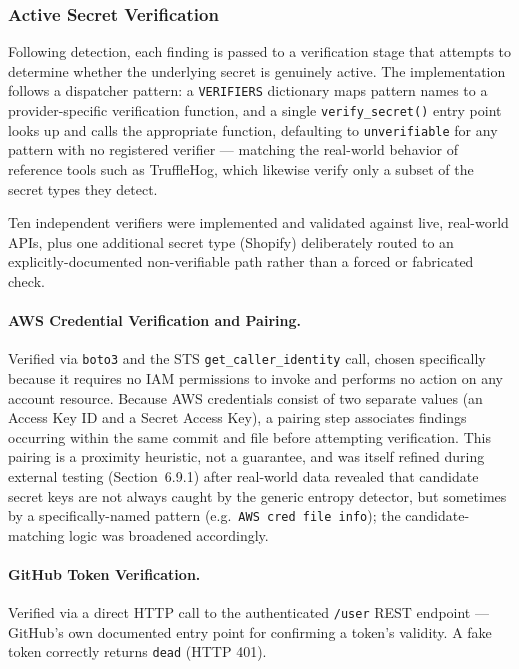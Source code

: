 \documentclass[12pt]{article}
\begin{document}
\subsubsection{Active Secret Verification}

Following detection, each finding is passed to a verification stage that attempts to determine whether the underlying secret is genuinely active. The implementation follows a dispatcher pattern: a \texttt{VERIFIERS} dictionary maps pattern names to a provider-specific verification function, and a single \texttt{verify\_secret()} entry point looks up and calls the appropriate function, defaulting to \texttt{unverifiable} for any pattern with no registered verifier --- matching the real-world behavior of reference tools such as TruffleHog, which likewise verify only a subset of the secret types they detect.

Ten independent verifiers were implemented and validated against live, real-world APIs, plus one additional secret type (Shopify) deliberately routed to an explicitly-documented non-verifiable path rather than a forced or fabricated check.

\paragraph{AWS Credential Verification and Pairing.}
Verified via \texttt{boto3} and the STS \texttt{get\_caller\_identity} call, chosen specifically because it requires no IAM permissions to invoke and performs no action on any account resource. Because AWS credentials consist of two separate values (an Access Key ID and a Secret Access Key), a pairing step associates findings occurring within the same commit and file before attempting verification. This pairing is a proximity heuristic, not a guarantee, and was itself refined during external testing (Section~6.9.1) after real-world data revealed that candidate secret keys are not always caught by the generic entropy detector, but sometimes by a specifically-named pattern (e.g.\ \texttt{AWS cred file info}); the candidate-matching logic was broadened accordingly.

\paragraph{GitHub Token Verification.}
Verified via a direct HTTP call to the authenticated \texttt{/user} REST endpoint --- GitHub's own documented entry point for confirming a token's validity. A fake token correctly returns \texttt{dead} (HTTP 401).
\end{document}
